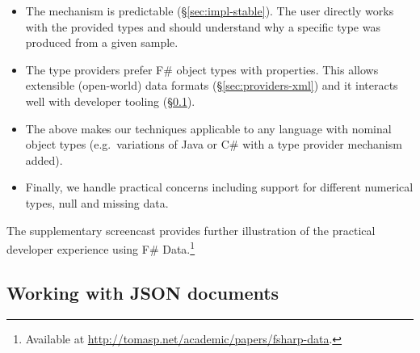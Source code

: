 \documentclass[10pt,nocopyrightspace]{sigplanconf}
\newcommand{\kvd}[1]{\textnormal{\textcolor{kvdclr}{\sffamily #1}}}
\begin{document}
\begin{itemize}
\item The mechanism is predictable (\S\ref{sec:impl-stable}). The user directly works with the
  provided types and should understand why a specific type was produced from a given sample.

\item The type providers prefer F\# object types with properties. This allows extensible
  (open-world) data formats (\S\ref{sec:providers-xml}) and it interacts well with developer tooling
  (\S\ref{sec:providers-json}).

\item The above makes our techniques applicable to any language with nominal
  object types (e.g.~variations of Java or C\# with a type provider mechanism added).

\item Finally, we handle practical concerns including
  support for different numerical types, \kvd{null} and missing data.
\end{itemize}

\noindent
The supplementary screencast provides further illustration of the practical developer
experience using F\# Data.\footnote{Available at \url{http://tomasp.net/academic/papers/fsharp-data}.}


\subsection{Working with JSON documents}
\label{sec:providers-json}
\end{document}
